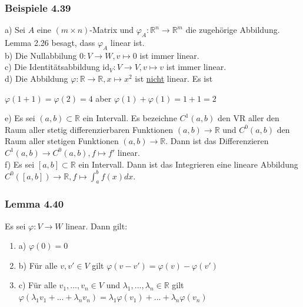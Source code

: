 \documentclass{article}
\begin{document}
\subsubsection*{Beispiele 4.39}
a) Sei $A$ eine $(m \times n)$-Matrix und $\varphi_A: \mathbb{R}^n \rightarrow \mathbb{R}^m$ die zugehörige Abbildung. Lemma 2.26 besagt, dass $\varphi_A$ linear ist. \\
b) Die Nullabbilung $0: V \rightarrow W, v \mapsto 0$ ist immer linear. \\
c) Die Identitätsabbildung $\text{id}_V: V \rightarrow V, v \mapsto v$ ist immer linear. \\
d) Die Abbildung $\varphi: \mathbb{R} \rightarrow \mathbb{R}, x \mapsto x^2$ ist \underline{nicht} linear. Es ist 
\begin{center}
    $\varphi(1 + 1) = \varphi(2) = 4$ aber $\varphi(1) + \varphi(1) = 1 + 1 = 2$ \\
\end{center}
e) Es sei $(a,b) \subset \mathbb{R}$ ein Intervall. Es bezeichne $C^1(a,b)$ den VR aller den Raum aller stetig differenzierbaren Funktionen $(a,b) \rightarrow \mathbb{R}$ und $C^0(a,b)$ den Raum aller stetigen Funktionen $(a,b) \rightarrow \mathbb{R}$. 
Dann ist das Differenzieren $C^1(a,b) \rightarrow C^0(a,b), f \mapsto f'$ linear. \\
f) Es sei $[a,b] \subset \mathbb{R}$ ein Intervall. Dann ist das Integrieren eine lineare Abbildung $C^0([a,b]) \rightarrow \mathbb{R}, f \mapsto \int_{a}^{b} f(x) dx$. \\

\subsubsection*{Lemma 4.40}
Es sei $\varphi: V \rightarrow W$ linear. Dann gilt: \\
\begin{enumerate}
    \item a) $\varphi(0) = 0$ \\
    \item b) Für alle $v, v' \in V$ gilt $\varphi(v-v') = \varphi(v) - \varphi(v')$ \\
    \item c) Für alle $v_1,...,v_n \in V$ und $\lambda_1,...,\lambda_n \in \mathbb{R}$ gilt $\varphi(\lambda_1 v_1 + ... + \lambda_n v_n) = \lambda_1 \varphi(v_1) + ... + \lambda_n \varphi(v_n)$ \\
\end{enumerate}
\end{document}
